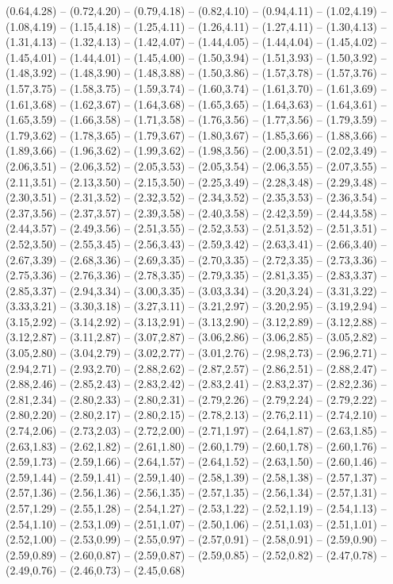 \expandafter\def\csname geo:gebiet:FRA\endcsname{
  (0.64,4.28) -- (0.72,4.20) -- (0.79,4.18) -- (0.82,4.10) -- (0.94,4.11) -- (1.02,4.19) -- (1.08,4.19) -- (1.15,4.18) -- (1.25,4.11) -- (1.26,4.11) -- (1.27,4.11) -- (1.30,4.13) -- (1.31,4.13) -- (1.32,4.13) -- (1.42,4.07) -- (1.44,4.05) -- (1.44,4.04) -- (1.45,4.02) -- (1.45,4.01) -- (1.44,4.01) -- (1.45,4.00) -- (1.50,3.94) -- (1.51,3.93) -- (1.50,3.92) -- (1.48,3.92) -- (1.48,3.90) -- (1.48,3.88) -- (1.50,3.86) -- (1.57,3.78) -- (1.57,3.76) -- (1.57,3.75) -- (1.58,3.75) -- (1.59,3.74) -- (1.60,3.74) -- (1.61,3.70) -- (1.61,3.69) -- (1.61,3.68) -- (1.62,3.67) -- (1.64,3.68) -- (1.65,3.65) -- (1.64,3.63) -- (1.64,3.61) -- (1.65,3.59) -- (1.66,3.58) -- (1.71,3.58) -- (1.76,3.56) -- (1.77,3.56) -- (1.79,3.59) -- (1.79,3.62) -- (1.78,3.65) -- (1.79,3.67) -- (1.80,3.67) -- (1.85,3.66) -- (1.88,3.66) -- (1.89,3.66) -- (1.96,3.62) -- (1.99,3.62) -- (1.98,3.56) -- (2.00,3.51) -- (2.02,3.49) -- (2.06,3.51) -- (2.06,3.52) -- (2.05,3.53) -- (2.05,3.54) -- (2.06,3.55) -- (2.07,3.55) -- (2.11,3.51) -- (2.13,3.50) -- (2.15,3.50) -- (2.25,3.49) -- (2.28,3.48) -- (2.29,3.48) -- (2.30,3.51) -- (2.31,3.52) -- (2.32,3.52) -- (2.34,3.52) -- (2.35,3.53) -- (2.36,3.54) -- (2.37,3.56) -- (2.37,3.57) -- (2.39,3.58) -- (2.40,3.58) -- (2.42,3.59) -- (2.44,3.58) -- (2.44,3.57) -- (2.49,3.56) -- (2.51,3.55) -- (2.52,3.53) -- (2.51,3.52) -- (2.51,3.51) -- (2.52,3.50) -- (2.55,3.45) -- (2.56,3.43) -- (2.59,3.42) -- (2.63,3.41) -- (2.66,3.40) -- (2.67,3.39) -- (2.68,3.36) -- (2.69,3.35) -- (2.70,3.35) -- (2.72,3.35) -- (2.73,3.36) -- (2.75,3.36) -- (2.76,3.36) -- (2.78,3.35) -- (2.79,3.35) -- (2.81,3.35) -- (2.83,3.37) -- (2.85,3.37) -- (2.94,3.34) -- (3.00,3.35) -- (3.03,3.34) -- (3.20,3.24) -- (3.31,3.22) -- (3.33,3.21) -- (3.30,3.18) -- (3.27,3.11) -- (3.21,2.97) -- (3.20,2.95) -- (3.19,2.94) -- (3.15,2.92) -- (3.14,2.92) -- (3.13,2.91) -- (3.13,2.90) -- (3.12,2.89) -- (3.12,2.88) -- (3.12,2.87) -- (3.11,2.87) -- (3.07,2.87) -- (3.06,2.86) -- (3.06,2.85) -- (3.05,2.82) -- (3.05,2.80) -- (3.04,2.79) -- (3.02,2.77) -- (3.01,2.76) -- (2.98,2.73) -- (2.96,2.71) -- (2.94,2.71) -- (2.93,2.70) -- (2.88,2.62) -- (2.87,2.57) -- (2.86,2.51) -- (2.88,2.47) -- (2.88,2.46) -- (2.85,2.43) -- (2.83,2.42) -- (2.83,2.41) -- (2.83,2.37) -- (2.82,2.36) -- (2.81,2.34) -- (2.80,2.33) -- (2.80,2.31) -- (2.79,2.26) -- (2.79,2.24) -- (2.79,2.22) -- (2.80,2.20) -- (2.80,2.17) -- (2.80,2.15) -- (2.78,2.13) -- (2.76,2.11) -- (2.74,2.10) -- (2.74,2.06) -- (2.73,2.03) -- (2.72,2.00) -- (2.71,1.97) -- (2.64,1.87) -- (2.63,1.85) -- (2.63,1.83) -- (2.62,1.82) -- (2.61,1.80) -- (2.60,1.79) -- (2.60,1.78) -- (2.60,1.76) -- (2.59,1.73) -- (2.59,1.66) -- (2.64,1.57) -- (2.64,1.52) -- (2.63,1.50) -- (2.60,1.46) -- (2.59,1.44) -- (2.59,1.41) -- (2.59,1.40) -- (2.58,1.39) -- (2.58,1.38) -- (2.57,1.37) -- (2.57,1.36) -- (2.56,1.36) -- (2.56,1.35) -- (2.57,1.35) -- (2.56,1.34) -- (2.57,1.31) -- (2.57,1.29) -- (2.55,1.28) -- (2.54,1.27) -- (2.53,1.22) -- (2.52,1.19) -- (2.54,1.13) -- (2.54,1.10) -- (2.53,1.09) -- (2.51,1.07) -- (2.50,1.06) -- (2.51,1.03) -- (2.51,1.01) -- (2.52,1.00) -- (2.53,0.99) -- (2.55,0.97) -- (2.57,0.91) -- (2.58,0.91) -- (2.59,0.90) -- (2.59,0.89) -- (2.60,0.87) -- (2.59,0.87) -- (2.59,0.85) -- (2.52,0.82) -- (2.47,0.78) -- (2.49,0.76) -- (2.46,0.73) -- (2.45,0.68) }
